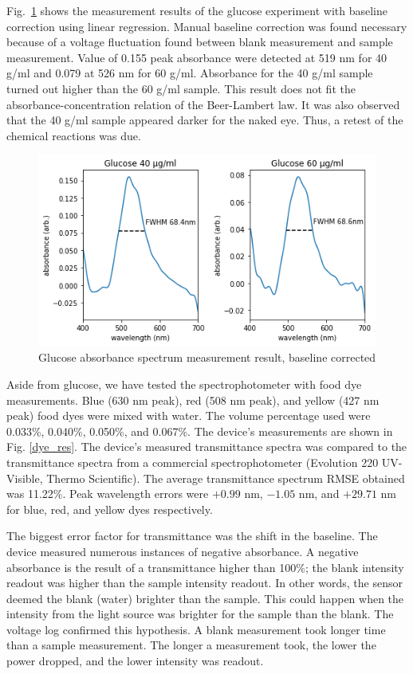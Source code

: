 \documentclass[conference]{IEEEtran}
\begin{document}
Fig.~\ref{glucose_result} shows the measurement results of the glucose experiment with baseline correction using linear regression.
Manual baseline correction was found necessary because of a voltage fluctuation found between blank measurement and sample measurement.
Value of 0.155 peak absorbance were detected at 519 nm for 40 {\textmu}g/ml and 0.079 at 526 nm for 60 {\textmu}g/ml.
Absorbance for the 40 {\textmu}g/ml sample turned out higher than the 60 {\textmu}g/ml sample.
This result does not fit the absorbance-concentration relation of the Beer-Lambert law.
It was also observed that the 40 {\textmu}g/ml sample appeared darker for the naked eye.
Thus, a retest of the chemical reactions was due.

    \begin{figure}[htbp]
    \centerline{\includegraphics[scale=0.5]{glucose-res.png}}
    \caption{Glucose absorbance spectrum measurement result, baseline corrected}
    \label{glucose_result}
    \end{figure}

Aside from glucose, we have tested the spectrophotometer with food dye measurements.
Blue (630 nm peak), red (508 nm peak), and yellow (427 nm peak) food dyes were mixed with water.
The volume percentage used were 0.033\%, 0.040\%, 0.050\%, and 0.067\%.
The device's measurements are shown in Fig. \ref{dye_res}.
The device's measured transmittance spectra was compared to the transmittance spectra from a commercial spectrophotometer (Evolution 220 UV-Visible, Thermo Scientific).
The average transmittance spectrum RMSE obtained was 11.22\%.
Peak wavelength errors were $+0.99$ nm, $-1.05$ nm, and $+29.71$ nm for blue, red, and yellow dyes respectively.

The biggest error factor for transmittance was the shift in the baseline.
The device measured numerous instances of negative absorbance.
A negative absorbance is the result of a transmittance higher than 100\%; the blank intensity readout was higher than the sample intensity readout.
In other words, the sensor deemed the blank (water) brighter than the sample.
This could happen when the intensity from the light source was brighter for the sample than the blank.
The voltage log confirmed this hypothesis.
A blank measurement took longer time than a sample measurement.
The longer a measurement took, the lower the power dropped, and the lower intensity was readout.
\end{document}
